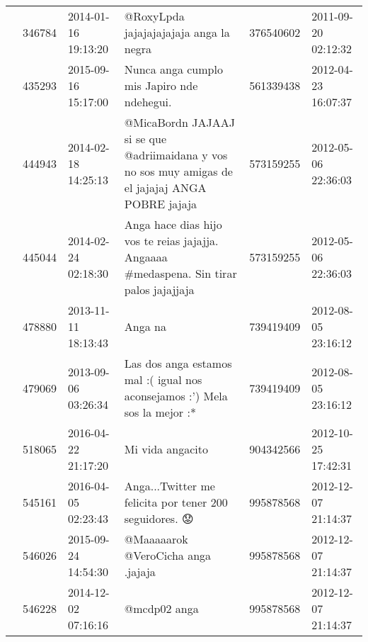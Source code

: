 \begin{tabular}{llllrl}
           & 346784  & 2014-01-16 19:13:20 &                                                                                                       @RoxyLpda jajajajajajaja anga la negra &   376540602 & 2011-09-20 02:12:32 \\
           & 435293  & 2015-09-16 15:17:00 &                                                                                                   Nunca anga cumplo mis Japiro nde ndehegui. &   561339438 & 2012-04-23 16:07:37 \\
           & 444943  & 2014-02-18 14:25:13 &                                            @MicaBordn JAJAAJ si se que @adriimaidana y vos no sos muy amigas de el jajajaj ANGA POBRE jajaja &   573159255 & 2012-05-06 22:36:03 \\
           & 445044  & 2014-02-24 02:18:30 &                                                      Anga hace dias hijo vos te reias jajajja. Angaaaa \#medaspena. Sin tirar palos jajajjaja &   573159255 & 2012-05-06 22:36:03 \\
           & 478880  & 2013-11-11 18:13:43 &                                                                                                                                      Anga na &   739419409 & 2012-08-05 23:16:12 \\
           & 479069  & 2013-09-06 03:26:34 &                                                                   Las dos anga estamos mal :( igual nos aconsejamos :') Mela sos la mejor :* &   739419409 & 2012-08-05 23:16:12 \\
           & 518065  & 2016-04-22 21:17:20 &                                                                                                                             Mi vida angacito &   904342566 & 2012-10-25 17:42:31 \\
           & 545161  & 2016-04-05 02:23:43 &                                                                                       Anga...Twitter me felicita por tener 200 seguidores. 😟 &   995878568 & 2012-12-07 21:14:37 \\
           & 546026  & 2015-09-24 14:54:30 &                                                                                                           @Maaaaarok @VeroCicha anga .jajaja &   995878568 & 2012-12-07 21:14:37 \\
           & 546228  & 2014-12-02 07:16:16 &                                                                                                                                 @mcdp02 anga &   995878568 & 2012-12-07 21:14:37 \\

\end{tabular}
